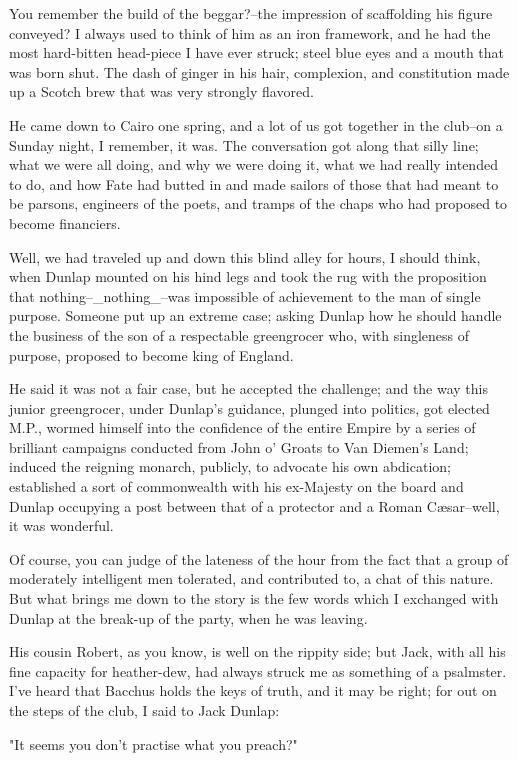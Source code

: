 You remember the build of the beggar?--the impression of scaffolding
his figure conveyed? I always used to think of him as an iron
framework, and he had the most hard-bitten head-piece I have ever
struck; steel blue eyes and a mouth that was born shut. The dash of
ginger in his hair, complexion, and constitution made up a Scotch brew
that was very strongly flavored.

He came down to Cairo one spring, and a lot of us got together in the
club--on a Sunday night, I remember, it was. The conversation got
along that silly line; what we were all doing, and why we were doing
it, what we had really intended to do, and how Fate had butted in and
made sailors of those that had meant to be parsons, engineers of the
poets, and tramps of the chaps who had proposed to become financiers.

Well, we had traveled up and down this blind alley for hours, I should
think, when Dunlap mounted on his hind legs and took the rug with the
proposition that nothing--_nothing_--was impossible of achievement to
the man of single purpose. Someone put up an extreme case; asking
Dunlap how he should handle the business of the son of a respectable
greengrocer who, with singleness of purpose, proposed to become king
of England.

He said it was not a fair case, but he accepted the challenge; and the
way this junior greengrocer, under Dunlap's guidance, plunged into
politics, got elected M.P., wormed himself into the confidence of the
entire Empire by a series of brilliant campaigns conducted from John
o' Groats to Van Diemen's Land; induced the reigning monarch, publicly,
to advocate his own abdication; established a sort of commonwealth with
his ex-Majesty on the board and Dunlap occupying a post between that of
a protector and a Roman Cæsar--well, it was wonderful.

Of course, you can judge of the lateness of the hour from the fact
that a group of moderately intelligent men tolerated, and contributed
to, a chat of this nature. But what brings me down to the story is the
few words which I exchanged with Dunlap at the break-up of the party,
when he was leaving.

His cousin Robert, as you know, is well on the rippity side; but Jack,
with all his fine capacity for heather-dew, had always struck me as
something of a psalmster. I've heard that Bacchus holds the keys of
truth, and it may be right; for out on the steps of the club, I said
to Jack Dunlap:

"It seems you don't practise what you preach?"

